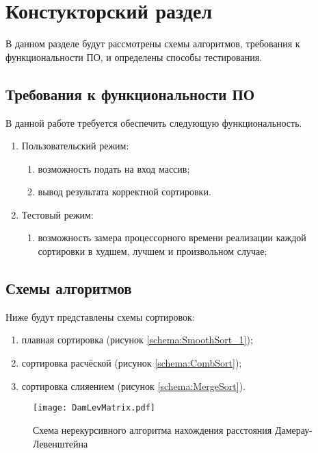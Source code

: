 \chapter{ Констукторский раздел}
\label{cha:design}
    В данном разделе будут рассмотрены схемы алгоритмов, требования к функциональности ПО, и определены способы тестирования.
    
    \section{Требования к функциональности ПО}
        В данной работе требуется обеспечить следующую функциональность.
        \begin{enumerate}
            \item Пользовательский режим:
            \begin{enumerate}
                \item возможность подать на вход массив;
                \item вывод результата корректной сортировки.
            \end{enumerate}
	\item Тестовый режим: 
            \begin{enumerate}
            	\item возможность замера процессорного времени реализации каждой сортировки в худшем, лучшем и произвольном случае;
            \end{enumerate}
        \end{enumerate}
	
	\section{Схемы алгоритмов}
        Ниже будут представлены схемы сортировок: \begin{enumerate}
            \item плавная сортировка (рисунок \ref{schema:SmoothSort_1});
            \item сортировка расчёской (рисунок \ref{schema:CombSort});
            \item сортировка слияением (рисунок \ref{schema:MergeSort}).
        \end{enumerate}
      
       	    \begin{figure}[h!]
       		\centering
       		\texttt{[image: DamLevMatrix.pdf]}
       		\caption{Схема нерекурсивного алгоритма нахождения расстояния Дамерау-Левенштейна}
       		\label{schema:matr:DamLevenstein}
       	\end{figure}\clearpage
       	
